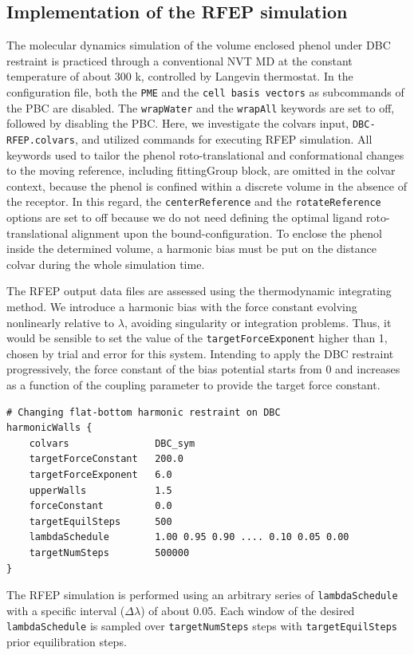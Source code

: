 \documentclass[9pt,tutorial]{livecoms}
\begin{document}
\subsection{Implementation of the RFEP simulation}\label{section 8.2}
The molecular dynamics simulation of the volume enclosed phenol under DBC restraint is practiced through a conventional NVT MD at the constant temperature of about 300 k, controlled by Langevin thermostat. In the configuration file, both the \texttt{PME} and the \texttt{cell basis vectors} as subcommands of the PBC are disabled. The \texttt{wrapWater} and the \texttt{wrapAll} keywords are set to off, followed by disabling the PBC. Here, we investigate the colvars input, \texttt{DBC-RFEP.colvars}, and utilized commands for executing RFEP simulation. All keywords used to tailor the phenol roto-translational and conformational changes to the moving reference, including fittingGroup block, are omitted in the colvar context, because the phenol is confined within a discrete volume in the absence of the receptor. In this regard, the \texttt{centerReference} and the \texttt{rotateReference} options are set to off because we do not need defining the optimal ligand roto-translational alignment upon the bound-configuration. To enclose the phenol inside the determined volume, a harmonic bias must be put on the distance colvar during the whole simulation time.

The RFEP output data files are assessed using the thermodynamic integrating method. We introduce a harmonic bias with the force constant evolving nonlinearly relative to {$\lambda$}, avoiding singularity or integration problems. Thus, it would be sensible to set the value of the \texttt{targetForceExponent} higher than 1, chosen by trial and error for this system. Intending to apply the DBC restraint progressively, the force constant of the bias potential starts from 0 and increases as a function of the coupling parameter to provide the target force constant.

\begin{verbatim}
# Changing flat-bottom harmonic restraint on DBC 
harmonicWalls {
    colvars               DBC_sym
    targetForceConstant   200.0
    targetForceExponent   6.0
    upperWalls            1.5  
    forceConstant         0.0
    targetEquilSteps      500
    lambdaSchedule        1.00 0.95 0.90 .... 0.10 0.05 0.00
    targetNumSteps        500000
}
\end{verbatim}

The RFEP simulation is performed using an arbitrary series of \texttt{lambdaSchedule} with a specific interval ({$\Delta\lambda$}) of about 0.05. Each window of the desired \texttt{lambdaSchedule} is sampled over \texttt{targetNumSteps} steps with \texttt{targetEquilSteps} prior equilibration steps.
\end{document}
